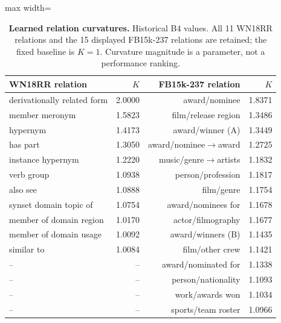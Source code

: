 \begin{table}[t]
\centering
\caption{\textbf{Learned relation curvatures.} Historical B4 values. All 11 WN18RR relations and the 15 displayed FB15k-237 relations are retained; the fixed baseline is $K=1$. Curvature magnitude is a parameter, not a performance ranking.}
\label{tab:curvatures}
\footnotesize\setlength{\tabcolsep}{4.2pt}\renewcommand{\arraystretch}{1.12}
\begin{adjustbox}{max width=\linewidth}
\begin{tabular}{lrrr}
\toprule
WN18RR relation & $K$ & FB15k-237 relation & $K$ \\
\midrule
derivationally related form & 2.0000 & award/nominee & 1.8371 \\
member meronym & 1.5823 & film/release region & 1.3486 \\
hypernym & 1.4173 & award/winner (A) & 1.3449 \\
has part & 1.3050 & award/nominee$\to$award & 1.2725 \\
instance hypernym & 1.2220 & music/genre$\to$artists & 1.1832 \\
verb group & 1.0938 & person/profession & 1.1817 \\
also see & 1.0888 & film/genre & 1.1754 \\
synset domain topic of & 1.0754 & award/nominees for & 1.1678 \\
member of domain region & 1.0170 & actor/filmography & 1.1677 \\
member of domain usage & 1.0092 & award/winners (B) & 1.1435 \\
similar to & 1.0084 & film/other crew & 1.1421 \\
-- & -- & award/nominated for & 1.1338 \\
-- & -- & person/nationality & 1.1093 \\
-- & -- & work/awards won & 1.1034 \\
-- & -- & sports/team roster & 1.0966 \\
\bottomrule
\end{tabular}
\end{adjustbox}
\end{table}
